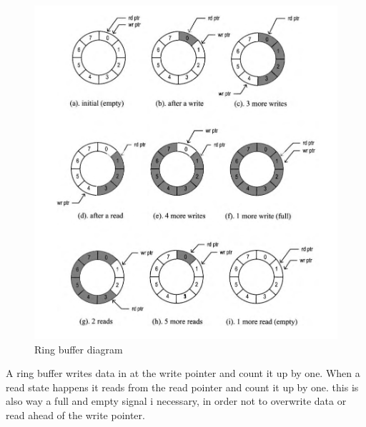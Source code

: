 \begin{figure}[H]
	\begin{centering}
		\includegraphics[width=1.0\textwidth]{images/tb5_fifo_ring.png}
		\caption{Ring buffer diagram}
	\end{centering}
\end{figure}
A ring buffer writes data in at the write pointer and count it up by one. When a read state happens it reads from the read pointer and count it up by one. this is also way a full and empty signal i necessary, in order not to overwrite data or read ahead of the write pointer.

